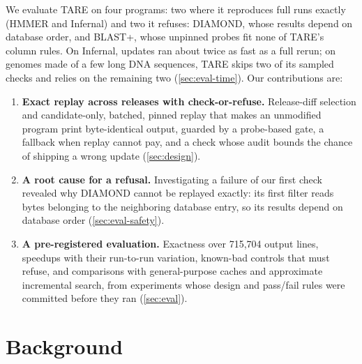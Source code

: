 \documentclass[letterpaper,twocolumn,10pt]{article}
\theoremstyle{definition}
\newcommand{\sys}{TARE\xspace}
\newcommand{\sys}{PARE\xspace}
\begin{document}
We evaluate \sys on four programs: two where it reproduces full runs exactly (HMMER and Infernal) and two it refuses:
DIAMOND, whose results depend on database order, and BLAST+, whose unpinned probes fit none of \sys's column rules. On Infernal, updates ran about twice as fast as a full rerun; on genomes made of
a few long DNA sequences, \sys skips two of its sampled checks and relies on the remaining two (\cref{sec:eval-time}).
Our contributions are:
\begin{enumerate}
  \item \textbf{Exact replay across releases with check\nobreakdash-or\nobreakdash-refuse.} Release\nobreakdash-diff selection and candidate\nobreakdash-only, batched,
  pinned replay that makes an unmodified program print byte\nobreakdash-identical output, guarded by a
  probe\nobreakdash-based gate, a fallback when replay cannot pay, and a check whose audit bounds the chance of shipping a
  wrong update (\cref{sec:design}).
  \item \textbf{A root cause for a refusal.} Investigating a failure of our first check revealed why DIAMOND cannot be
  replayed exactly: its first filter reads bytes belonging to the neighboring database entry, so its results depend
  on database order (\cref{sec:eval-safety}).
  \item \textbf{A pre\nobreakdash-registered evaluation.} Exactness over 715{,}704 output lines, speedups with their run\nobreakdash-to-run
  variation, known\nobreakdash-bad controls that must refuse, and comparisons with general\nobreakdash-purpose caches and approximate
  incremental search, from experiments whose design and pass/fail
  rules were committed before they ran (\cref{sec:eval}).
\end{enumerate}

\section{Background}
\label{sec:background}
\end{document}
